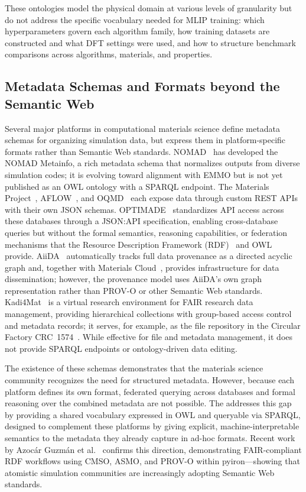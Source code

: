 These ontologies model the physical domain at various levels of granularity but
do not address the specific vocabulary needed for MLIP training: which
hyperparameters govern each algorithm family, how training datasets are
constructed and what DFT settings were used, and how to structure benchmark
comparisons across algorithms, materials, and properties.

\subsection{Metadata Schemas and Formats beyond the Semantic Web}

Several major platforms in computational materials science define metadata
schemas for organizing simulation data, but express them in
platform-specific formats rather than Semantic Web standards.
NOMAD~\cite{draxl2023nomad} has developed the NOMAD Metainfo, a rich
metadata schema that normalizes outputs from diverse simulation codes; it is
evolving toward alignment with EMMO but is not yet published as an OWL
ontology with a SPARQL endpoint.
The Materials Project~\cite{jain2013mp},
AFLOW~\cite{curtarolo2012aflow}, and OQMD~\cite{saal2013oqmd} each expose
data through custom REST APIs with their own JSON schemas.
OPTIMADE~\cite{andersen2021optimade} standardizes API access across these
databases through a JSON:API specification, enabling cross-database queries
but without the formal semantics, reasoning capabilities, or federation
mechanisms that the Resource Description Framework
(RDF)~\cite{rdf11concepts} and OWL~\cite{owl2overview} provide.
AiiDA~\cite{huber2020aiida} automatically tracks full data provenance as
a directed acyclic graph and, together with Materials
Cloud~\cite{talirz2020materialscloud}, provides infrastructure for data
dissemination; however, the provenance model uses AiiDA's own graph
representation rather than PROV-O or other Semantic Web standards.
Kadi4Mat~\cite{brandt2021kadi4mat} is a virtual research environment for
FAIR research data management, providing hierarchical collections with
group-based access control and metadata records; it serves, for example, as
the file repository in the Circular Factory
CRC~1574~\cite{thapa2025inf}. While effective for file and metadata
management, it does not provide SPARQL endpoints or ontology-driven data
editing.

The existence of these schemas demonstrates that the materials science
community recognizes the need for structured metadata. However, because each
platform defines its own format, federated querying across databases and
formal reasoning over the combined metadata are not possible. The
\MLIPsOntology{} addresses this gap by providing a shared vocabulary
expressed in OWL and queryable via SPARQL, designed to complement these
platforms by giving explicit, machine-interpretable semantics to the metadata
they already capture in ad-hoc formats. Recent work by Azoc{\'a}r Guzm{\'a}n
et al.~\cite{azocarguzman2026workflows} confirms this direction,
demonstrating FAIR-compliant RDF workflows using CMSO, ASMO, and PROV-O
within pyiron---showing that atomistic simulation communities are
increasingly adopting Semantic Web standards.

